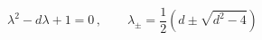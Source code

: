 \begin{equation}
\lambda^2-d\lambda+1=0\,, \qquad \lambda_{\pm}={\frac12}(d\pm
\sqrt{d^2-4})
\end{equation}

